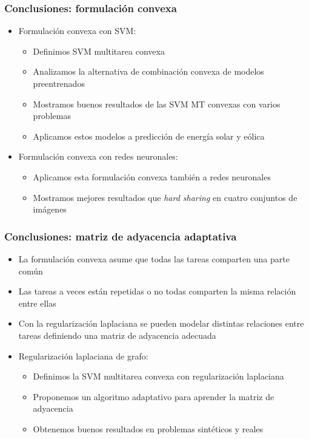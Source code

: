 \documentclass[aspectratio=43,spanish]{beamer}
\begin{document}
\begin{frame}
      \frametitle{Conclusiones: formulación convexa}
      \begin{itemize}
            \item Formulación convexa con SVM:
            \begin{itemize}
                  \item Definimos SVM multitarea convexa
                  \item Analizamos la alternativa de combinación convexa de modelos preentrenados
                  \item Mostramos buenos resultados de las SVM MT convexas con varios problemas
                  \item Aplicamos estos modelos a predicción de energía solar y eólica
            \end{itemize}
            \item Formulación convexa con redes neuronales:
            \begin{itemize}
                  \item Aplicamos esta formulación convexa también a redes neuronales
                  \item Mostramos mejores resultados que \emph{hard sharing} en cuatro conjuntos de imágenes
            \end{itemize}
                  
      \end{itemize}
      \end{frame}

\begin{frame}
\frametitle{Conclusiones: matriz de adyacencia adaptativa}
\begin{itemize}
      
      \item La formulación convexa asume que todas las tareas comparten una parte común
      \item Las tareas a veces están repetidas o no todas comparten la misma relación entre ellas
      \item Con la regularización laplaciana se pueden modelar distintas relaciones entre tareas definiendo una matriz de adyacencia adecuada
      \item Regularización laplaciana de grafo:
      \begin{itemize}
            \item Definimos la SVM multitarea convexa con regularización laplaciana 
            \item Proponemos un algoritmo adaptativo para aprender la matriz de adyacencia
            \item Obtenemos buenos resultados en problemas sintéticos y reales
      \end{itemize}
      \  
\end{itemize}
\end{frame}
\end{document}
